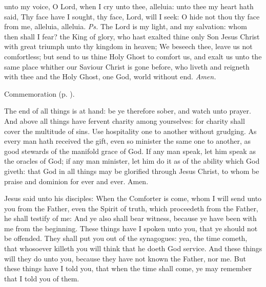 

\introit
{} unto my voice, O Lord, when I cry unto thee, alleluia: unto thee my heart hath said, Thy face have I sought, thy face, Lord, will I seek: O hide not thou thy face from me, alleluia, alleluia. \textit{Ps.} The Lord is my light, and my salvation: whom then shall I fear?
\collect
{} the King of glory, who hast exalted thine only Son Jesus Christ with great triumph unto thy kingdom in heaven; We beseech thee, leave us not comfortless; but send to us thine Holy Ghost to comfort us, and exalt us unto the same place whither our Saviour Christ is gone before, who liveth and reigneth with thee and the Holy Ghost, one God, world without end. \textit{Amen.}

\begin{rubric}
    Commemoration  (p. \pageref{AscensionCollect}).
\end{rubric}

 The end of all things is at hand: be ye therefore sober, and watch unto prayer. And above all things have fervent charity among yourselves: for charity shall cover the multitude of sins. Use hospitality one to another without grudging. As every man hath received the gift, even so minister the same one to another, as good stewards of the manifold grace of God. If any man speak, let him speak as the oracles of God; if any man minister, let him do it as of the ability which God giveth: that God in all things may be glorified through Jesus Christ, to whom be praise and dominion for ever and ever. Amen.


 Jesus said unto his disciples: When the Comforter is come, whom I will send unto you from the Father, even the Spirit of truth, which proceedeth from the Father, he shall testify of me: And ye also shall bear witness, because ye have been with me from the beginning. These things have I spoken unto you, that ye should not be offended. They shall put you out of the synagogues: yea, the time cometh, that whosoever killeth you will think that he doeth God service. And these things will they do unto you, because they have not known the Father, nor me. But these things have I told you, that when the time shall come, ye may remember that I told you of them.

